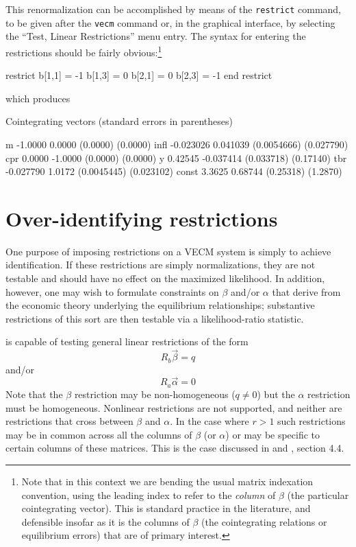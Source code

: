 This renormalization can be accomplished by means of the
\texttt{restrict} command, to be given after the \texttt{vecm} command
or, in the graphical interface, by selecting the ``Test, Linear
Restrictions'' menu entry. The syntax for entering the restrictions
should be fairly obvious:\footnote{Note that in this context we are
  bending the usual matrix indexation convention, using the leading
  index to refer to the \textit{column} of $\beta$ (the particular
  cointegrating vector).  This is standard practice in the literature,
  and defensible insofar as it is the columns of $\beta$ (the
  cointegrating relations or equilibrium errors) that are of primary
  interest.}
\begin{code}
restrict
  b[1,1] = -1
  b[1,3] = 0
  b[2,1] = 0
  b[2,3] = -1
end restrict
\end{code}
which produces

\begin{code}
Cointegrating vectors (standard errors in parentheses)

m          -1.0000       0.0000 
           (0.0000)     (0.0000) 
infl     -0.023026     0.041039 
        (0.0054666)   (0.027790) 
cpr         0.0000      -1.0000 
           (0.0000)     (0.0000) 
y          0.42545    -0.037414 
         (0.033718)    (0.17140) 
tbr      -0.027790       1.0172 
        (0.0045445)   (0.023102) 
const       3.3625      0.68744 
          (0.25318)     (1.2870) 
\end{code}

\section{Over-identifying restrictions}
\label{sec:johansen-overid}

One purpose of imposing restrictions on a VECM system is simply to
achieve identification.  If these restrictions are simply
normalizations, they are not testable and should have no effect on the
maximized likelihood.  In addition, however, one may wish to formulate
constraints on $\beta$ and/or $\alpha$ that derive from the economic
theory underlying the equilibrium relationships; substantive
restrictions of this sort are then testable via a likelihood-ratio
statistic.

 is capable of testing general linear restrictions of the
form 
\begin{equation}
\label{eq:Rb}
R_b \vec{\beta} = q
\end{equation}
and/or
\begin{equation}
\label{eq:Ra}
R_a \vec{\alpha} = 0
\end{equation}
%
Note that the $\beta$ restriction may be non-homogeneous ($q \neq 0$)
but the $\alpha$ restriction must be homogeneous.  Nonlinear
restrictions are not supported, and neither are restrictions that
cross between $\beta$ and $\alpha$.  In the case where $r > 1$ such
restrictions may be in common across all the columns of $\beta$ (or
$\alpha$) or may be specific to certain columns of these matrices.
This is the case discussed in \cite{boswijk95} and
\cite{boswijk-doornik04}, section 4.4.

